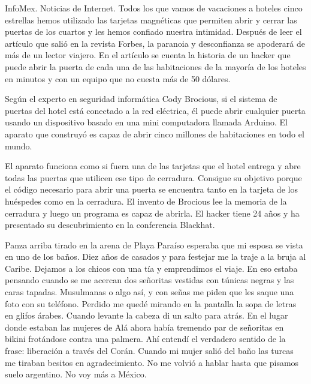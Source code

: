 \documentclass[11pt,twoside,openright,a6paper]{book}
\begin{document}
InfoMex. Noticias de Internet. Todos los que vamos de vacaciones a hoteles
cinco estrellas hemos utilizado las tarjetas magnéticas que permiten
abrir y cerrar las puertas de los cuartos y les hemos confiado nuestra
intimidad. Después de leer el artículo que salió en la revista Forbes,
la paranoia y desconfianza se apoderará de más de un lector viajero. En
el artículo se cuenta la historia de un hacker que puede abrir la puerta
de cada una de las habitaciones de la mayoría de los hoteles en minutos
y con un equipo que no cuesta más de 50 dólares.

Según el experto en seguridad informática Cody Brocious, si el sistema
de puertas del hotel está conectado a la red eléctrica, él puede abrir
cualquier puerta usando un dispositivo basado en una mini computadora llamada
Arduino. El aparato que construyó es capaz de abrir cinco millones de
habitaciones en todo el mundo.

El aparato funciona como si fuera una de las tarjetas que el hotel entrega
y abre todas las puertas que utilicen ese tipo de cerradura. Consigue su
objetivo porque el código necesario para abrir una puerta se encuentra
tanto en la tarjeta de los huéspedes como en la cerradura. El invento de
Brocious lee la memoria de la cerradura y luego un programa es capaz de
abrirla. El hacker tiene 24 años y ha presentado su descubrimiento en la
conferencia Blackhat.


\vspace{0.5cm}
\hrulefill\hspace{0.2cm} \decofourleft\decofourright \hspace{0.2cm} \hrulefill
\vspace{0.5cm}

Panza arriba tirado en la arena de Playa Paraíso esperaba que mi esposa se
vista en uno de los baños. Diez años de casados y para festejar me la traje
a la bruja al Caribe. Dejamos a los chicos con una tía y emprendimos el
viaje. En eso estaba pensando cuando se me acercan dos señoritas vestidas
con túnicas negras y las caras tapadas. Musulmanas o algo así, y con
señas me piden que les saque una foto con su teléfono. Perdido me quedé
mirando en la pantalla la sopa de letras en glifos árabes. Cuando levante
la cabeza di un salto para atrás. En el lugar donde estaban las mujeres de
Alá ahora había tremendo par de señoritas en bikini frotándose contra
una palmera. Ahí entendí el verdadero sentido de la frase: liberación a
través del Corán. Cuando mi mujer salió del baño las turcas me tiraban
besitos en agradecimiento. No me volvió a hablar hasta que pisamos suelo
argentino. No voy más a México.
\end{document}
